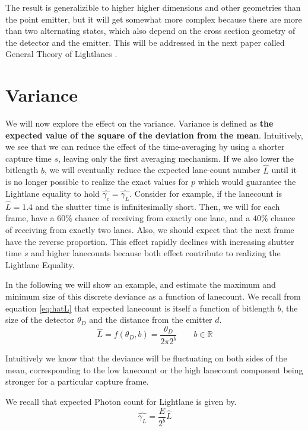 \documentclass[notitlepage]{article}
\begin{document}
The result is generalizible to higher higher dimensions and other geometries than the point emitter, but it will get somewhat more complex because there are more than two alternating states, which also depend on the cross section geometry of the detector and the emitter. This will be addressed in the next paper called General Theory of Lightlanes \cite{RhadamantysA3}. 

\section{Variance}
We will now explore the effect on the variance. Variance is defined as \textbf{the expected value of the square of the deviation from the mean}. Intuitively, we see that we can reduce the effect of the time-averaging by using a shorter capture time $s$, leaving only the first averaging mechanism. If we also lower the bitlength $b$, we will eventually reduce the expected lane-count number $\hat{L}$ until it is no longer possible to realize the exact values for $p$ which would guarantee the Lightlane equality to hold $\hat{\gamma_c} = \hat{\gamma_L}$. Consider for example, if the lanecount is $\hat{L} = 1.4$ and the shutter time is infinitesimally short. Then, we will for each frame, have a $60\%$ chance of receiving from exactly one lane, and a $40\%$ chance of receiving from exactly two lanes. Also, we should expect that the next frame have the reverse proportion. This effect rapidly declines with increasing shutter time $s$ and higher lanecounts because both effect contribute to realizing the Lightlane Equality. 

In the following we will show an example, and estimate the maximum and minimum size of this discrete deviance as a function of lanecount. We recall from equation \eqref{eq:hatL} that expected lanecount is itself a function of bitlength $b$, the size of the detector $\theta_D$ and the distance from the emitter $d$.
\begin{equation}
\hat{L} = f(\theta_D, b) = \frac{\theta_D }{ 2\pi 2^b } \quad\quad 	b \in \mathbb{R}
\end{equation}

 Intuitively we know that the deviance will be fluctuating on both sides of the mean, corresponding to the low lanecount or the high lanecount component being stronger for a particular capture frame. 
 
 We recall that expected Photon count for Lightlane is given by.
 \begin{equation}
\label{eq:Twinkle1_repeated}
\hat{\gamma_L} =
\frac{E}{2^b}
\hat{L}
\end{equation}
\end{document}
